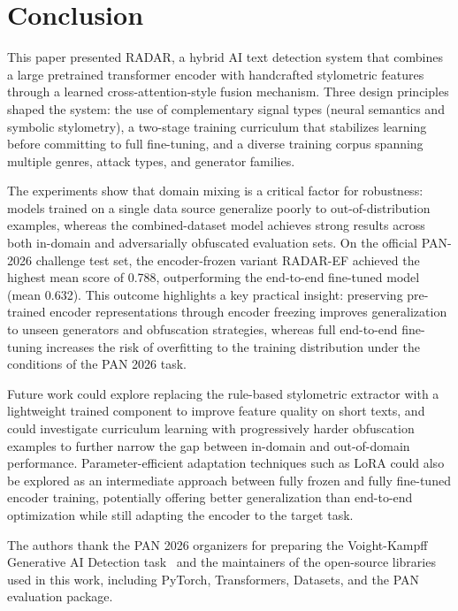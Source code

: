 \documentclass[]{ceurart}
\begin{document}
\section{Conclusion}

This paper presented RADAR, a hybrid AI text detection system that combines a
large pretrained transformer encoder with handcrafted stylometric features
through a learned cross-attention-style fusion mechanism. Three design principles
shaped the system: the use of complementary signal types (neural semantics and
symbolic stylometry), a two-stage training curriculum that stabilizes learning
before committing to full fine-tuning, and a diverse training corpus spanning
multiple genres, attack types, and generator families.

The experiments show that domain mixing is a critical factor for robustness:
models trained on a single data source generalize poorly to out-of-distribution
examples, whereas the combined-dataset model achieves strong results across both
in-domain and adversarially obfuscated evaluation sets. On the official PAN-2026
challenge test set, the encoder-frozen variant RADAR-EF achieved the highest mean
score of 0.788, outperforming the end-to-end fine-tuned model (mean 0.632).
This outcome highlights a key practical insight: preserving pre-trained encoder
representations through encoder freezing improves generalization to unseen
generators and obfuscation strategies, whereas full end-to-end fine-tuning
increases the risk of overfitting to the training distribution under the conditions
of the PAN 2026 task.

Future work could explore replacing the rule-based stylometric extractor with a
lightweight trained component to improve feature quality on short texts, and
could investigate curriculum learning with progressively harder obfuscation
examples to further narrow the gap between in-domain and out-of-domain
performance. Parameter-efficient adaptation techniques such as LoRA could also
be explored as an intermediate approach between fully frozen and fully fine-tuned
encoder training, potentially offering better generalization than end-to-end
optimization while still adapting the encoder to the target task.

\begin{acknowledgments}
The authors thank the PAN 2026 organizers for preparing the Voight-Kampff Generative AI Detection task~\cite{bevendorff:2026b,bevendorff:2026c} and the maintainers of the open-source libraries used in this work, including PyTorch, Transformers, Datasets, and the PAN evaluation package.\cite{bevendorff:2025,froebe:2023b}
\end{acknowledgments}
\end{document}
